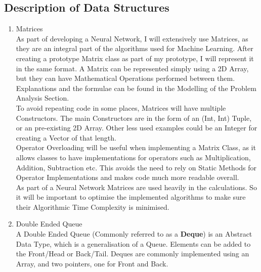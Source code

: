 \begin{flushleft}
                \vspace{0.5cm}
        \vspace{0.5cm}
        \subsection{Description of Data Structures}
            \large
            \vspace{0.2cm}
            \begin{enumerate}
                \item {\Large Matrices} \\
                As part of developing a Neural Network, I will extensively use Matrices, as they are an integral part of the algorithms
                used for Machine Learning. After creating a prototype Matrix class as part of my prototype, I will represent it in the
                same format. A Matrix can be represented simply using a 2D Array, but they can have Mathematical Operations performed
                between them. Explanations and the formulae can be found in the Modelling of the Problem Analysis Section. \\
                \vspace{0.2cm}
                To avoid repeating code in some places, Matrices will have multiple Constructors. The main Constructors are in the form 
                of an (Int, Int) Tuple, or an pre-existing 2D Array. Other less used examples could be an Integer for creating 
                a Vector of that length. \\
                \vspace{0.2cm}
                Operator Overloading will be useful when implementing a Matrix Class, as it allows classes to have implementations for
                operators such as Multiplication, Addition, Subtraction etc. This avoids the need to rely on Static Methods for Operator
                Implementations and makes code much more readable overall. \\
                \vspace{0.2cm}
                As part of a Neural Network Matrices are used heavily in the calculations. So it will be important to optimise the
                implemented algorithms to make sure their Algorithmic Time Complexity is minimised. \\

                \vspace{0.5cm}
                \item {\Large Double Ended Queue} \\
                A Double Ended Queue (Commonly referred to as a {\textbf{Deque}}) is an Abstract Data Type, which is a generalisation of 
                a Queue. Elements can be added to the Front/Head or Back/Tail. Deques are commonly implemented using an Array, and two
                pointers, one for Front and Back.


\end{enumerate}
\end{flushleft}
